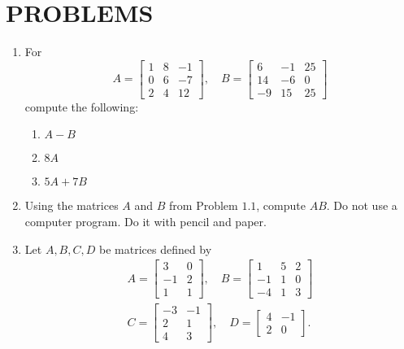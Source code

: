 \documentclass[../main.tex]{subfiles}
\begin{document}
\section[Problems]{PROBLEMS}
\begin{enumerate}[label=\textbf{1.\arabic*}]
	\item For
$$
A=\left[\begin{array}{lll}
1 & 8 & -1 \\
0 & 6 & -7 \\
2 & 4 & 12
\end{array}\right], \quad 	B=\left[\begin{array}{ccc}
6 & -1 & 25 \\
14 & -6 & 0 \\
-9 & 15 & 25
\end{array}\right]
$$
compute the following:
	\begin{enumerate}[label = \textbf{\alph*.}]
		\item $A-B$
		\item $8 A$
		\item $5 A+7 B$
	\end{enumerate}

\item Using the matrices $A$ and $B$ from Problem $1.1$, compute $A B .$ Do not use a computer program. Do it with pencil and paper.

\item Let $A, B, C, D$ be matrices defined by
$$
\begin{array}{c}
A=\left[\begin{array}{cc}
3 & 0 \\
-1 & 2 \\
1 & 1
\end{array}\right], \quad  B=\left[\begin{array}{ccc}
1 & 5 & 2 \\
-1 & 1 & 0 \\
-4 & 1 & 3
\end{array}\right] \\
C=\left[\begin{array}{cc}
-3 & -1 \\
2 & 1 \\
4 & 3
\end{array}\right], \quad D=\left[\begin{array}{cc}
4 & -1 \\
2 & 0
\end{array}\right] .
\end{array}
$$


\end{enumerate}
\end{document}
